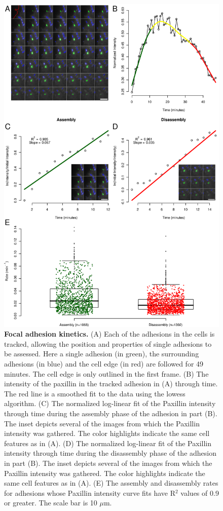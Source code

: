 \documentclass[letterpaper,draft]{article}
\begin{document}
\begin{figure}[htbp]
\begin{center}
\includegraphics[height=0.8\textheight]{../figures/kinetics/kinetics}
\caption{
{\bf Focal adhesion kinetics.} (A) Each of the adhesions in the cells is tracked, allowing the position and properties of single adhesions to be assessed. Here a single adhesion (in green), the surrounding adhesions (in blue) and the cell edge (in red) are followed for 49 minutes. The cell edge is only outlined in the first frame. (B) The intensity of the paxillin in the tracked adhesion in (A) through time. The red line is a smoothed fit to the data using the lowess algorithm. (C) The normalized log-linear fit of the Paxillin intensity through time during the assembly phase of the adhesion in part (B). The inset depicts several of the images from which the Paxillin intensity was gathered. The color highlights indicate the same cell features as in (A). (D) The normalized log-linear fit of the Paxillin intensity through time during the disassembly phase of the adhesion in part (B). The inset depicts several of the images from which the Paxillin intensity was gathered. The color highlights indicate the same cell features as in (A). (E) The assembly and disassembly rates for adhesions whose Paxillin intensity curve fits have R$^2$ values of 0.9 or greater. The scale bar is 10 $\mu$m.
}
\label{kinetics}
\end{center}
\end{figure}
\end{document}
